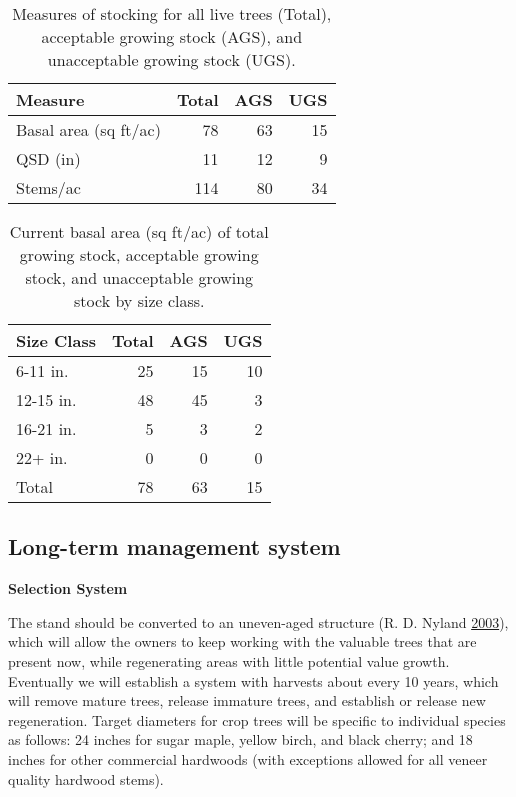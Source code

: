 \documentclass[]{tufte-handout}
\begin{document}
\begin{table}

\caption{\label{tab:unnamed-chunk-18}Measures of stocking for all live trees (Total), acceptable growing stock (AGS), and unacceptable growing stock (UGS).}
\centering
\begin{tabular}[t]{lrrr}
\toprule
Measure & Total & AGS & UGS\\
\midrule
Basal area (sq ft/ac) & 78 & 63 & 15\\
QSD (in) & 11 & 12 & 9\\
Stems/ac & 114 & 80 & 34\\
\bottomrule
\end{tabular}
\end{table}

\begin{table}

\caption{\label{tab:unnamed-chunk-19}Current basal area (sq ft/ac) of total growing stock, acceptable growing stock, and unacceptable growing stock by size class.}
\centering
\begin{tabular}[t]{lrrr}
\toprule
Size Class & Total & AGS & UGS\\
\midrule
6-11 in. & 25 & 15 & 10\\
12-15 in. & 48 & 45 & 3\\
16-21 in. & 5 & 3 & 2\\
22+ in. & 0 & 0 & 0\\
Total & 78 & 63 & 15\\
\bottomrule
\end{tabular}
\end{table}

\subsection{Long-term management
system}\label{long-term-management-system-2}

\textbf{Selection System}

The stand should be converted to an uneven-aged structure (R. D. Nyland
\protect\hyperlink{ref-nyland_even-_2003}{2003}), which will allow the
owners to keep working with the valuable trees that are present now,
while regenerating areas with little potential value growth. Eventually
we will establish a system with harvests about every 10 years, which
will remove mature trees, release immature trees, and establish or
release new regeneration. Target diameters for crop trees will be
specific to individual species as follows: 24 inches for sugar maple,
yellow birch, and black cherry; and 18 inches for other commercial
hardwoods (with exceptions allowed for all veneer quality hardwood
stems).
\end{document}
